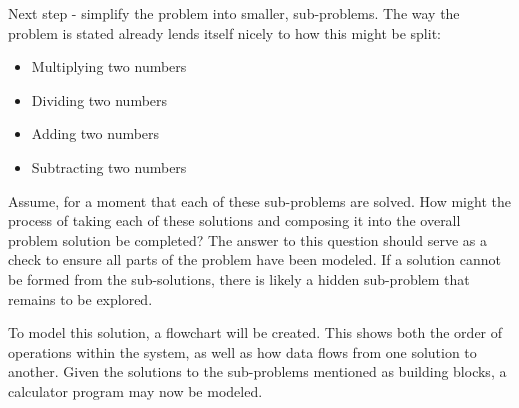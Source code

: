 \documentclass[../main.tex]{subfiles}
\begin{document}
Next step - simplify the problem into smaller, sub-problems. The way the problem is
stated already lends itself nicely to how this might be split:
\begin{itemize}
	\item Multiplying two numbers
	\item Dividing two numbers
	\item Adding two numbers
	\item Subtracting two numbers
\end{itemize}

Assume, for a moment that each of these sub-problems are solved. How might the 
process of taking each of these solutions and composing it into the overall problem
solution be completed? The answer to this question should serve as a check to ensure
all parts of the problem have been modeled. If a solution cannot be formed from
the sub-solutions, there is likely a hidden sub-problem that remains to be explored.

To model this solution, a flowchart will be created. This shows both the order of
operations within the system, as well as how data flows from one solution to another. Given the solutions to the sub-problems mentioned as building blocks, a calculator program may now be modeled.
\end{document}
